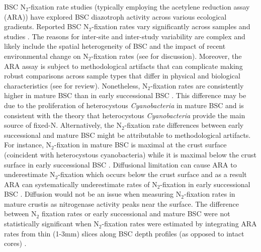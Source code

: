 BSC N$_{2}$-fixation rate studies (typically employing the acetylene reduction
assay (ARA)) have explored BSC diazotroph activity across various ecological
gradients. Reported BSC N$_{2}$-fixation rates vary significantly across
samples and studies \citep{Evans_2001}.  The reasons for inter-site and
inter-study variability are complex and likely include the spatial
heterogeneity of BSC \citep{Evans_2001} and the impact of recent environmental
change on N$_{2}$-fixation rates (see \citet{Belnap_2001} for discussion).
Moreover, the ARA assay is subject to methodological artifacts that can
complicate making robust comparisons across sample types that differ in
physical and biological characteristics (see \citet{Belnap_2001} for review).
Nonetheless, N$_{2}$-fixation rates are consistently higher in mature BSC than
in early successional BSC \citep{Belnap_2002, 14766579}. This difference
may be due to the proliferation of heterocystous \textit{Cyanobacteria} in
mature BSC and is consistent with the theory that heterocystous
\textit{Cyanobacteria} provide the main source of fixed-N.
Alternatively, the N$_{2}$-fixation rate differences between early
successional and mature BSC might be attributable to methodological artifacts.
For instance, N$_{2}$-fixation in mature BSC is maximal at the crust surface
(coincident with heterocystous cyanobacteria) while it is maximal below the
crust surface in early successional BSC \citep{15643930}. Diffusional
limitation can cause ARA to underestimate N$_{2}$-fixation which
occurs below the crust surface and as a result ARA can systematically
underestimate rates of N$_{2}$-fixation in early successional BSC
\citep{15643930}. Diffusion would not be an issue when measuring
N$_{2}$-fixation rates in mature crustis as nitrogenase activity peaks near the
surface.  The difference between N$_{2}$ fixation rates or early
successional and mature BSC were not statistically significant when
N$_{2}$-fixation rates were estimated by integrating ARA rates from
thin (1-3mm) slices along BSC depth profiles (as opposed to 
intact cores) \citep{15643930}.

